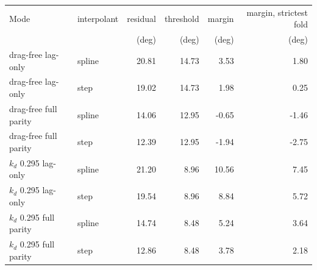 \footnotesize
\begin{tabular}{llrrrr}
\toprule
Mode & interpolant & residual & threshold & margin & margin, strictest fold \\
 & & (deg) & (deg) & (deg) & (deg) \\
\midrule
drag-free lag-only & spline & 20.81 & 14.73 & 3.53 & 1.80 \\
drag-free lag-only & step & 19.02 & 14.73 & 1.98 & 0.25 \\
drag-free full parity & spline & 14.06 & 12.95 & -0.65 & -1.46 \\
drag-free full parity & step & 12.39 & 12.95 & -1.94 & -2.75 \\
$k_d$ 0.295 lag-only & spline & 21.20 & 8.96 & 10.56 & 7.45 \\
$k_d$ 0.295 lag-only & step & 19.54 & 8.96 & 8.84 & 5.72 \\
$k_d$ 0.295 full parity & spline & 14.74 & 8.48 & 5.24 & 3.64 \\
$k_d$ 0.295 full parity & step & 12.86 & 8.48 & 3.78 & 2.18 \\
\bottomrule
\end{tabular}
